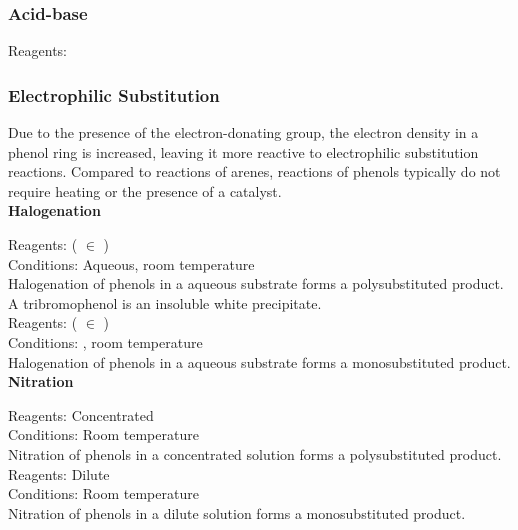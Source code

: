 \documentclass[../main]{subfiles}
\begin{document}
	\subsubsection{Acid-base}

	Reagents:  \\


	\subsubsection{Electrophilic Substitution}

	Due to the presence of the electron-donating  group, the electron density in a phenol ring is increased, leaving it more reactive to electrophilic substitution reactions. Compared to reactions of arenes, reactions of phenols typically do not require heating or the presence of a catalyst. \\

	\noindent \textbf{Halogenation}

	Reagents:  ( \(\in\) ) \\
	Conditions:  Aqueous, room temperature\\

	Halogenation of phenols in a aqueous substrate forms a polysubstituted product. A tribromophenol is an insoluble white precipitate. \\

	Reagents:  ( \(\in\) ) \\
	Conditions: , room temperature\\

	Halogenation of phenols in a aqueous substrate forms a monosubstituted product. \\

	\noindent \textbf{Nitration}

	Reagents: Concentrated  \\
	Conditions: Room temperature\\

	Nitration of phenols in a concentrated solution forms a polysubstituted product. \\

	Reagents: Dilute  \\
	Conditions: Room temperature\\

	Nitration of phenols in a dilute solution forms a monosubstituted product. \\
\end{document}
